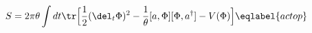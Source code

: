 \begin{equation}
S = 2\pi\theta \int dt \tr\Bigl[ {\frac12} (\del_t\Phi)^2
- {\frac{1}{\theta}} [a,\Phi][\Phi,a^\dagger] - V(\Phi) \Bigr]
\eqlabel{actop}
\end{equation}

